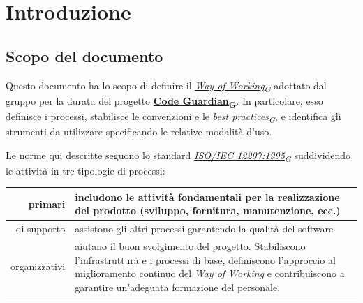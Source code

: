 \documentclass[12pt, a4paper]{article}
\newcommand{\urlglossario}{https://skynetunigroup.github.io/Code_Guardian/Documentazione/PB/glossario_v2.0.0.pdf} %
\newcommand{\glo}[2]{\href{\urlglossario\#nameddest=#2}{#1\textsubscript{G}}}
\begin{document}
\newpage


\tableofcontents

\iftotalfigures
    \vspace{1cm}
    \listoffigures
\fi
\newpage


\section{Introduzione}

\subsection{Scopo del documento}

Questo documento ha lo scopo di definire il \textit{\glo{Way of Working}{wow}} adottato dal gruppo per la durata del progetto \textbf{\glo{Code Guardian}{code-guardian}}. In particolare, esso definisce i processi, stabilisce le convenzioni e le \textit{\glo{best practices}{best-practices}}, e identifica gli strumenti da utilizzare specificando le relative modalità d'uso. 

Le norme qui descritte seguono lo standard \textit{\glo{ISO/IEC 12207:1995}{iso-iec-12207-1995}}
suddividendo le attività in tre tipologie di processi:

\begin{table}[ht]
    \centering
    \renewcommand{\arraystretch}{1.3}
    \begin{tabularx}{\textwidth}{|r|X|}
        \hline
        primari & 
        includono le attività fondamentali per la realizzazione del prodotto
        (sviluppo, fornitura, manutenzione, ecc.) \\ \hline
        di supporto &
        assistono gli altri processi garantendo la qualità del software \\ \hline
        organizzativi & 
        aiutano il buon svolgimento del progetto. Stabiliscono
        l'infrastruttura e i processi di base, definiscono l'approccio al miglioramento continuo del \textit{Way of Working} e contribuiscono a garantire un'adeguata formazione del personale. \\ \hline
    \end{tabularx}
\end{table}
\end{document}
